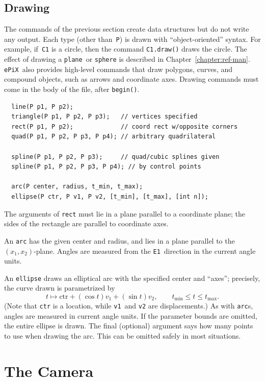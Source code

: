 \documentclass[12pt]{report}
\newcommand{\code}[1]{\texttt{#1}}
\newcommand{\ePiX}{\code{ePiX}}
\begin{document}
\subsection*{Drawing}

The commands of the previous section create data structures but do not
write any output. Each type (other than~\code{P}) is drawn with
``object-oriented'' syntax.  For example, if~\code{C1} is a circle,
then the command \code{C1.draw()} draws the circle. The effect of
drawing a \code{plane}~or \code{sphere} is described in
Chapter~\ref{chapter:ref-man}. \ePiX\ also provides high-level
commands that draw polygons, curves, and compound objects, such as
arrows and coordinate axes.  Drawing commands must come
in the body of the file, after \code{begin()}.

\begin{verbatim}
  line(P p1, P p2);
  triangle(P p1, P p2, P p3);   // vertices specified
  rect(P p1, P p2);             // coord rect w/opposite corners
  quad(P p1, P p2, P p3, P p4); // arbitrary quadrilateral

  spline(P p1, P p2, P p3);     // quad/cubic splines given 
  spline(P p1, P p2, P p3, P p4); // by control points

  arc(P center, radius, t_min, t_max);
  ellipse(P ctr, P v1, P v2, [t_min], [t_max], [int n]);
\end{verbatim}
The arguments of \code{rect} must lie in a plane parallel to a
coordinate plane; the sides of the rectangle are parallel to
coordinate axes.

An \code{arc} has the given center and radius, and lies in a plane
parallel to the $(x_1,x_2)$-plane. Angles are measured from the
\code{E1}~direction in the current angle units.

An \code{ellipse} draws an elliptical arc with the specified center
and ``axes''; precisely, the curve drawn is parametrized by
\[
t\mapsto \mathrm{ctr} + (\cos t)v_1 + (\sin t)v_2,\qquad
t_\mathrm{min}\leq t\leq t_\mathrm{max}.
\]
(Note that \code{ctr} is a location, while \code{v1}~and \code{v2} are
displacements.)  As with \code{arc}s, angles are measured in current
angle units. If the parameter bounds are omitted, the entire ellipse
is drawn. The final (optional) argument says how many points to use
when drawing the arc. This can be omitted safely in most situations.


\section{The Camera}
\end{document}
